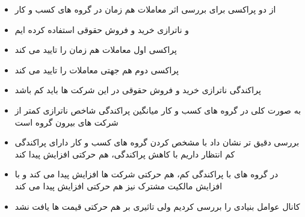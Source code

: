 \documentclass[12pt, a4paper]{article}
\begin{document}
\begin{itemize}
\begin{itemize}
	\item
	از دو پراکسی برای بررسی اثر معاملات هم زمان در گروه های کسب و کار 
	\item
	و ناترازی خرید و فروش حقوقی استفاده کرده ایم
	\item
	پراکسی اول معاملات هم زمان را تایید می کند
	\item
	پراکسی دوم هم جهتی معاملات را تایید می کند
	\item
	پراکندگی ناترازی خرید و فروش حقوقی در این شرکت ها باید کم باشد
	\item 
	به صورت کلی در گروه های کسب و کار میانگین پراکندگی شاخص ناترازی کمتر از شرکت های بیرون گروه است
	\item
	بررسی دقیق تر نشان داد با مشخص کردن گروه های کسب و کار دارای پراکندگی کم انتظار داریم با کاهش پراکندگی، هم حرکتی افزایش پیدا کند
	\item
	در گروه های با پراکندگی کم، هم حرکتی شرکت ها افزایش پیدا می کند و با افزایش مالکیت مشترک نیز هم حرکتی افزایش پیدا می کند
	
	\item
	کانال عوامل بنیادی را بررسی کردیم ولی تاثیری بر هم حرکتی قیمت ها یافت نشد
	
\end{itemize}



\end{itemize}
\end{document}
